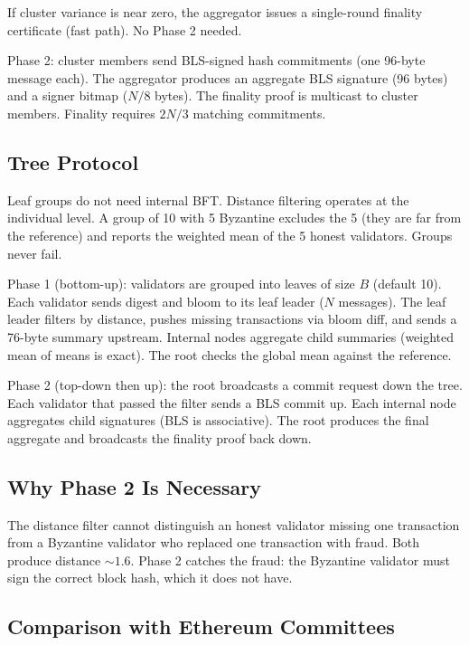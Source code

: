 \documentclass[conference]{IEEEtran}
\begin{document}
If cluster variance is near zero, the aggregator issues a single-round finality certificate (fast path). No Phase 2 needed.

Phase 2: cluster members send BLS-signed hash commitments (one 96-byte message each). The aggregator produces an aggregate BLS signature (96 bytes) and a signer bitmap ($N/8$ bytes). The finality proof is multicast to cluster members. Finality requires $2N/3$ matching commitments.

\subsection{Tree Protocol}

Leaf groups do not need internal BFT. Distance filtering operates at the individual level. A group of 10 with 5 Byzantine excludes the 5 (they are far from the reference) and reports the weighted mean of the 5 honest validators. Groups never fail.

Phase 1 (bottom-up): validators are grouped into leaves of size $B$ (default 10). Each validator sends digest and bloom to its leaf leader ($N$ messages). The leaf leader filters by distance, pushes missing transactions via bloom diff, and sends a 76-byte summary upstream. Internal nodes aggregate child summaries (weighted mean of means is exact). The root checks the global mean against the reference.

Phase 2 (top-down then up): the root broadcasts a commit request down the tree. Each validator that passed the filter sends a BLS commit up. Each internal node aggregates child signatures (BLS is associative). The root produces the final aggregate and broadcasts the finality proof back down.

\subsection{Why Phase 2 Is Necessary}

The distance filter cannot distinguish an honest validator missing one transaction from a Byzantine validator who replaced one transaction with fraud. Both produce distance $\sim 1.6$. Phase 2 catches the fraud: the Byzantine validator must sign the correct block hash, which it does not have.

\subsection{Comparison with Ethereum Committees}
\end{document}
